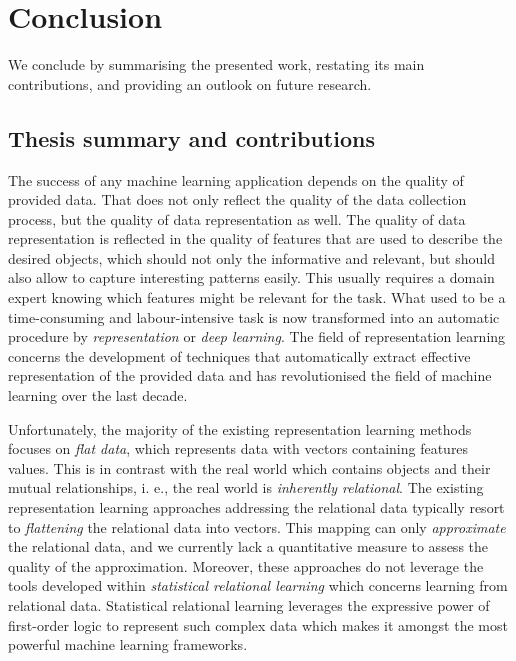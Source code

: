 \chapter{Conclusion}\label{ch:conclusion}


We conclude by summarising the presented work, restating its main contributions,
and providing an outlook on future research.



\section{Thesis summary and contributions}


The success of any machine learning application depends on the quality of provided data.
That does not only  reflect the quality of the data collection process, but the quality of data representation as well.
The quality of data representation is reflected in the quality of features that are used to describe the desired objects, which should not only the informative and relevant, but should also allow to capture interesting patterns easily.
This usually requires a domain expert knowing which features might be relevant for the task.
What used to be a time-consuming and labour-intensive task is now transformed into an automatic procedure by \textit{representation} or \textit{deep learning}.
The field of representation learning concerns the development of techniques that automatically extract effective representation of the provided data and has revolutionised the field of machine learning over the last decade.


Unfortunately,  the majority of the existing representation learning methods focuses on \textit{flat data}, which represents data with vectors containing features values.
This is in contrast with the real world which contains objects and their mutual relationships, i. e., the real world is \textit{inherently relational}.
The existing representation learning approaches addressing the relational data typically resort to \textit{flattening} the relational data into vectors.
This mapping can only \textit{approximate} the relational data, and we currently lack a quantitative measure to assess the quality of the approximation.
Moreover, these approaches do not leverage the tools developed within \textit{statistical relational learning} which concerns learning from relational data.
Statistical relational learning leverages the expressive power of first-order logic to represent such complex data which makes it amongst the most powerful machine learning frameworks.



